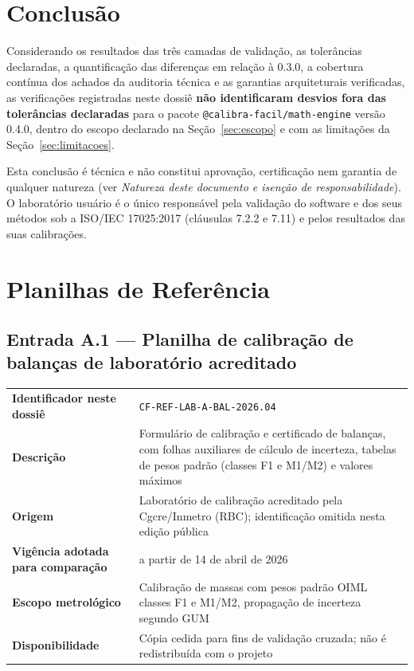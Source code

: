 \documentclass[11pt,a4paper]{article}
\newcommand{\docVersion}{0.4.0}
\newcommand{\previousVersion}{0.3.0}
\begin{document}
\section{Conclusão}

Considerando os resultados das três camadas de validação, as tolerâncias declaradas, a quantificação das diferenças em relação à \previousVersion{}, a cobertura contínua dos achados da auditoria técnica e as garantias arquiteturais verificadas, as verificações registradas neste dossiê \textbf{não identificaram desvios fora das tolerâncias declaradas} para o pacote \texttt{@calibra-facil/math-engine} versão \docVersion{}, dentro do escopo declarado na Seção~\ref{sec:escopo} e com as limitações da Seção~\ref{sec:limitacoes}.

Esta conclusão é técnica e não constitui aprovação, certificação nem garantia de qualquer natureza (ver \emph{Natureza deste documento e isenção de responsabilidade}). O laboratório usuário é o único responsável pela validação do software e dos seus métodos sob a ISO/IEC 17025:2017 (cláusulas 7.2.2 e 7.11) e pelos resultados das suas calibrações.

\appendix

\section{Planilhas de Referência}
\label{app:planilhas}

\subsection{Entrada A.1 --- Planilha de calibração de balanças de laboratório acreditado}

\begin{tabularx}{\textwidth}{l X}
  \toprule
  \textbf{Identificador neste dossiê} & \texttt{CF-REF-LAB-A-BAL-2026.04} \\
  \textbf{Descrição} & Formulário de calibração e certificado de balanças, com folhas auxiliares de cálculo de incerteza, tabelas de pesos padrão (classes F1 e M1/M2) e valores máximos \\
  \textbf{Origem} & Laboratório de calibração acreditado pela Cgcre/Inmetro (RBC); identificação omitida nesta edição pública \\
  \textbf{Vigência adotada para comparação} & a partir de 14 de abril de 2026 \\
  \textbf{Escopo metrológico} & Calibração de massas com pesos padrão OIML classes F1 e M1/M2, propagação de incerteza segundo GUM \\
  \textbf{Disponibilidade} & Cópia cedida para fins de validação cruzada; não é redistribuída com o projeto \\
  \bottomrule
\end{tabularx}
\end{document}

